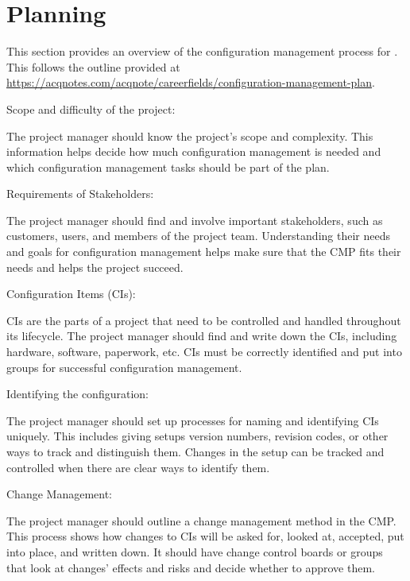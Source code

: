
\chapter{Planning}
\label{loc:Planning}


This section provides an overview of the configuration management process for \ThisSys.
This follows the outline provided at \url{https://acqnotes.com/acqnote/careerfields/configuration-management-plan}.


Scope and difficulty of the project: 

The project manager should know the project’s scope and complexity. This information helps decide how much configuration management is needed and which configuration management tasks should be part of the plan.

Requirements of Stakeholders: 

The project manager should find and involve important stakeholders, such as customers, users, and members of the project team. Understanding their needs and goals for configuration management helps make sure that the CMP fits their needs and helps the project succeed.

Configuration Items (CIs): 

CIs are the parts of a project that need to be controlled and handled throughout its lifecycle. The project manager should find and write down the CIs, including hardware, software, paperwork, etc. CIs must be correctly identified and put into groups for successful configuration management.

Identifying the configuration: 

The project manager should set up processes for naming and identifying CIs uniquely. This includes giving setups version numbers, revision codes, or other ways to track and distinguish them. Changes in the setup can be tracked and controlled when there are clear ways to identify them.

Change Management: 

The project manager should outline a change management method in the CMP. This process shows how changes to CIs will be asked for, looked at, accepted, put into place, and written down. It should have change control boards or groups that look at changes’ effects and risks and decide whether to approve them.

